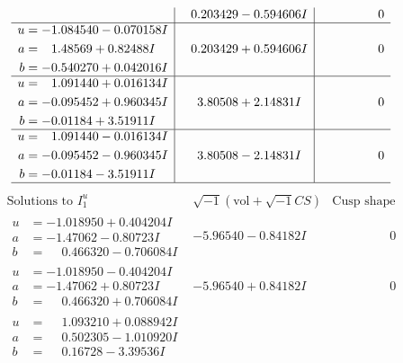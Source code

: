 \documentclass[1p]{elsarticle_modified}
\theoremstyle{definition}
\newcommand{\I}{\sqrt{-1}}
\begin{document}
$$\begin{array}{c|c|c}
 & \phantom{-}0.203429 - 0.594606 I & \phantom{-0.000000 } 0 \\ \hline\begin{aligned}
u &= -1.084540 - 0.070158 I \\
a &= \phantom{-}1.48569 + 0.82488 I \\
b &= -0.540270 + 0.042016 I\end{aligned}
 & \phantom{-}0.203429 + 0.594606 I & \phantom{-0.000000 } 0 \\ \hline\begin{aligned}
u &= \phantom{-}1.091440 + 0.016134 I \\
a &= -0.095452 + 0.960345 I \\
b &= -0.01184 + 3.51911 I\end{aligned}
 & \phantom{-}3.80508 + 2.14831 I & \phantom{-0.000000 } 0 \\ \hline\begin{aligned}
u &= \phantom{-}1.091440 - 0.016134 I \\
a &= -0.095452 - 0.960345 I \\
b &= -0.01184 - 3.51911 I\end{aligned}
 & \phantom{-}3.80508 - 2.14831 I & \phantom{-0.000000 } 0\\
 \hline 
 \end{array}$$\newpage$$\begin{array}{c|c|c}  
\text{Solutions to }I^u_{1}& \I (\text{vol} + \sqrt{-1}CS) & \text{Cusp shape}\\
 \hline 
\begin{aligned}
u &= -1.018950 + 0.404204 I \\
a &= -1.47062 - 0.80723 I \\
b &= \phantom{-}0.466320 - 0.706084 I\end{aligned}
 & -5.96540 - 0.84182 I & \phantom{-0.000000 } 0 \\ \hline\begin{aligned}
u &= -1.018950 - 0.404204 I \\
a &= -1.47062 + 0.80723 I \\
b &= \phantom{-}0.466320 + 0.706084 I\end{aligned}
 & -5.96540 + 0.84182 I & \phantom{-0.000000 } 0 \\ \hline\begin{aligned}
u &= \phantom{-}1.093210 + 0.088942 I \\
a &= \phantom{-}0.502305 - 1.010920 I \\
b &= \phantom{-}0.16728 - 3.39536 I\end{aligned}

\end{array}$$
\end{document}
